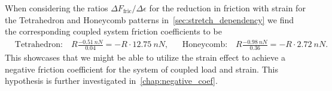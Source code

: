 When considering the ratios $\Delta F_{\text{fric}} / \Delta \epsilon$ for the reduction in friction with strain for the Tetrahedron and Honeycomb patterns in~\cref{sec:stretch_dependency} we find the corresponding coupled system friction coefficients to be 
\begin{align}
  &\text{Tetrahedron:} \quad R\frac{-\SI{0.51}{nN}}{0.04} = -R\cdot\SI{12.75}{nN},& &\text{Honeycomb:} \quad R\frac{-\SI{0.98}{nN}}{0.36} = -R\cdot\SI{2.72}{nN}.&
  \label{eq:pilot_study_mu_estimate}
\end{align}
This showcases that we might be able to utilize the strain effect to achieve a negative friction coefficient for the system of coupled load and strain. This hypothesis is further investigated in~\cref{chap:negative_coef}.







